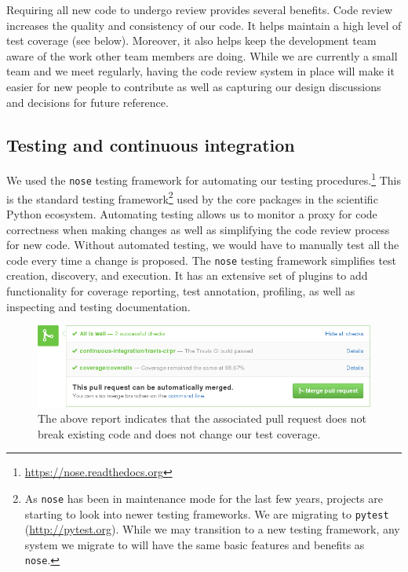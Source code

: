 \documentclass[]{article}
\begin{document}
Requiring all new code to undergo review provides several benefits.
Code review increases the quality and consistency of our code.
It helps maintain a high level of test coverage (see below).
Moreover, it also helps keep the development team aware of the work other team
members are doing.
While we are currently a small team and we meet regularly, having the code
review system in place will make it easier for new people to contribute as well
as capturing our design discussions and decisions for future reference.

\subsection{Testing and continuous integration}

We used the \texttt{nose} testing framework for automating our testing
procedures.\footnote{
\url{https://nose.readthedocs.org}
}
This is the standard testing framework\footnote{
    As \texttt{nose} has been in
    maintenance mode for the last few years, projects are starting to look
    into newer testing frameworks.
    We are migrating to \texttt{pytest} (\url{http://pytest.org}).
    While we may transition to a new testing framework, any system we
    migrate to will have the same basic features and benefits as \texttt{nose}.
}
used by the core packages in the scientific Python ecosystem.
Automating testing allows us to monitor a proxy for code correctness when
making changes as well as simplifying the code review process for new code.
Without automated testing, we would have to manually test all the code every
time a change is proposed.
The \texttt{nose} testing framework simplifies test creation, discovery, and
execution.
It has an extensive set of plugins to add functionality for coverage reporting,
test annotation, profiling, as well as inspecting and testing documentation.

\begin{figure}
  \begin{centering}
    \includegraphics[width=\textwidth]{_fig/pull-request-ci.png}\par
  \end{centering}

  \caption{\label{fig:pull-request}
  \small
    The above report indicates that the associated pull request does not
    break existing code and does not change our test coverage.}
\end{figure}
\end{document}
